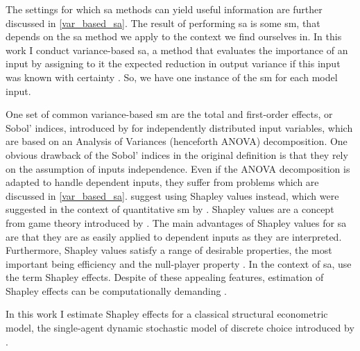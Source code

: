 The settings for which sa methods can yield useful information are further discussed in \cref{var_based_sa}. The result of performing sa is some sm, that depends on the sa method we apply to the context we find ourselves in. In this work I conduct variance-based sa, a method that evaluates the importance of an input by assigning to it the expected reduction in output variance if this input was known with certainty \citep{BP16}. So, we have one instance of the sm for each model input.

One set of common variance-based sm are the total and first-order effects, or Sobol' indices, introduced by \citet{S93} for independently distributed input variables, which are based on an Analysis of Variances (henceforth ANOVA) decomposition. One obvious drawback of the Sobol' indices in the original definition is that they rely on the assumption of inputs independence. Even if the ANOVA decomposition is adapted to handle dependent inputs, they suffer from problems \citep{OP17} which are discussed in \cref{var_based_sa}. \citet{OP17} suggest using Shapley values instead, which were suggested in the context of quantitative sm by \citet{O14}. Shapley values are a concept from game theory introduced by \citet{S53}. The main advantages of Shapley values for sa are that they are as easily applied to dependent inputs as they are interpreted. Furthermore, Shapley values satisfy a range of desirable properties, the most important being efficiency and the null-player property \citet{S53, O14}. In the context of sa, \citet{SNS16} use the term Shapley effects. Despite of these appealing features, estimation of Shapley effects can be computationally demanding \citep{SNS16}.

In this work I estimate Shapley effects for a classical structural econometric model, the single-agent dynamic stochastic model of discrete choice introduced by \citet{R87}.